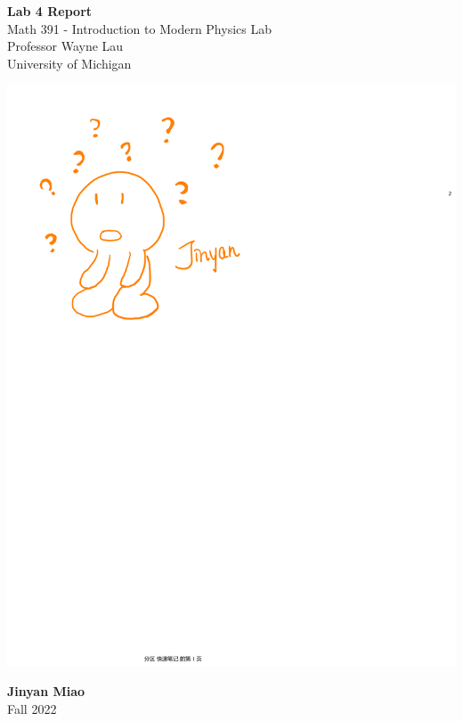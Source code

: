 \documentclass[11pt]{book}
\theoremstyle{break}
\theoremstyle{break}
\begin{document}
	\begin{titlepage}
		\begin{center}
			\vspace*{1cm}
			\Huge \color{red}
				\textbf{Lab 4 Report}\\
			\vspace{0.5cm}			
			\Large \color{black}
				Math 391 - Introduction to Modern Physics Lab\\
				Professor Wayne Lau\\	
				University of Michigan\\
			\vspace{3cm}

			\includegraphics[scale=0.8]{Jinyan'sQuestion.pdf}
			
			
			\vspace{5cm}
			\LARGE
				\textbf{Jinyan Miao}\\
				\hfill\break
				\LARGE Fall 2022\\
			\vspace{1cm}

		\vspace*{\fill}
		\end{center}			
	\end{titlepage}
\end{document}
